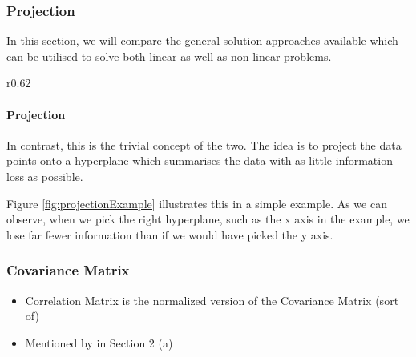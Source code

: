 \subsubsection{Projection}



In this section, we will compare the general solution approaches available which can be utilised to solve both linear as well as non-linear problems. \cite{HandsOnMLCh8}


\renewcommand{\tikzscale}{0.33}
\begin{wrapfigure}[13]{r}{0.62\textwidth}
	\vspace*{-8mm}
	\centering
	
	\captionsetup{justification=centering}
	\caption{Simple example of a projection}
    \label{fig:projectionExample}
\end{wrapfigure}

\paragraph{Projection} In contrast, this is the trivial concept of the two. The idea is to project the data points onto a \gls{hyperplane} which summarises the data with as little information loss as possible.

Figure \ref{fig:projectionExample} illustrates this in a simple example.
As we can observe, when we pick the right \gls{hyperplane}, such as the x axis in the example, we lose far fewer information than if we would have picked the y axis.





\clearpage



\subsubsection{Covariance Matrix}

\begin{itemize}
	\item Correlation Matrix is the normalized version of the Covariance Matrix (sort of)
	\item Mentioned by \cite{jolliffe2016principal} in Section 2 (a)
\end{itemize}

\clearpage



